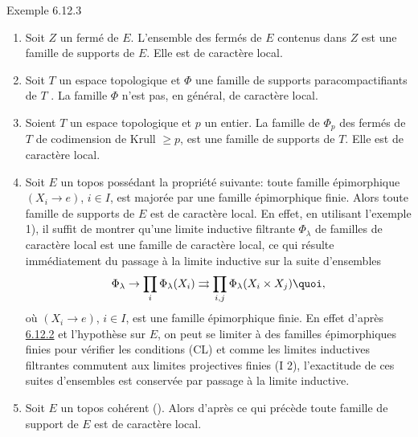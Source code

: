 \begin{enonce*}[remark]{Exemple 6.12.3}
\begin{enumerate}
\renewcommand{\labelenumi}{\theenumi)}
\item Soit $Z$ un fermé de $E$. L'ensemble des fermés de $E$
  contenus dans $Z$ est une famille de supports de $E$. Elle est de
  caractère local.

\item Soit $T$ un espace topologique et $\Phi$ une famille de supports
  paracompactifiants de $T$ \cite{7}. La famille $\Phi$ n'est pas, en
  général, de caractère local.

\item Soient $T$ un espace topologique et $p$ un entier. La famille de
  $\Phi_p$ des fermés de $T$ de codimension de Krull $\geq p$, est
  une famille de supports de $T$. Elle est de caractère local.

\item Soit $E$ un topos possédant la propriété suivante: toute
  famille épimorphique $(X_i \to e)$, $i \in I$, est majorée par
  une famille épimorphique finie. Alors toute famille de supports de
  $E$ est de caractère local. En effet, en utilisant l'exemple 1),
  il suffit de montrer qu'une limite inductive filtrante
  $\Phi_\lambda$ de familles de caractère local est une famille de
  caractère local, ce qui résulte immédiatement du passage à
  la limite inductive sur la suite d'ensembles
$$
\Phi_\lambda \to \prod_i \Phi_{\lambda} (X_i) \rightrightarrows
\prod_{i, j} \Phi_\lambda (X_i \times X_j){\quoi},
$$
où $(X_i \to e)$, $i \in I$, est une famille épimorphique
finie. En effet d'après \hyperref[V.subsubsec6.12.2]{6.12.2} et l'hypothèse sur $E$, on peut se
limiter à  des familles épimorphiques finies pour vérifier les
conditions (CL) et comme les limites inductives filtrantes commutent
aux limites projectives finies (I 2), l'exactitude de ces suites
d'ensembles est conservée par passage à la limite inductive.

\item Soit $E$ un topos cohérent (). Alors d'après ce qui
  précède toute famille de support de $E$ est de caractère
  local.
\end{enumerate}
\end{enonce*}

\setcounter{subsection}{12}
